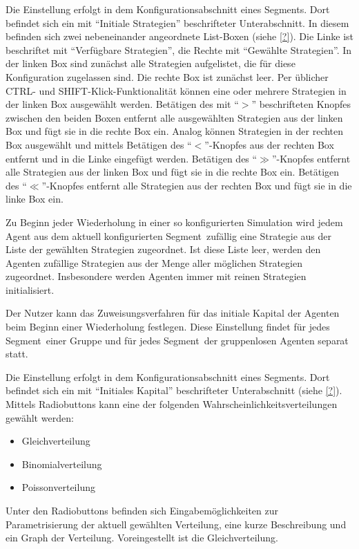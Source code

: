 \documentclass[parskip=full,11pt]{scrartcl}
\def\segment{Segment}
\begin{document}
Die Einstellung erfolgt in dem Konfigurationsabschnitt eines \segment s. Dort befindet sich ein mit \enquote{Initiale Strategien} beschrifteter Unterabschnitt. In diesem befinden sich zwei nebeneinander angeordnete List-Boxen (siehe \cref{?}). Die Linke ist beschriftet mit \enquote{Verfügbare Strategien}, die Rechte mit \enquote{Gewählte Strategien}. In der linken Box sind zunächst alle Strategien aufgelistet, die für diese Konfiguration zugelassen sind. Die rechte Box ist zunächst leer. Per üblicher \textsf{CTRL}- und \textsf{SHIFT}-Klick-Funktionalität können eine oder mehrere Strategien in der linken Box ausgewählt werden. Betätigen des mit \enquote{\(>\)} beschrifteten Knopfes zwischen den beiden Boxen entfernt alle ausgewählten Strategien aus der linken Box und fügt sie in die rechte Box ein. Analog können Strategien in der rechten Box ausgewählt und mittels Betätigen des \enquote{\(<\)}-Knopfes aus der rechten Box entfernt und in die Linke eingefügt werden. Betätigen des \enquote{\(\gg\)}-Knopfes entfernt alle Strategien aus der linken Box und fügt sie in die rechte Box ein. Betätigen des \enquote{\(\ll\)}-Knopfes entfernt alle Strategien aus der rechten Box und fügt sie in die linke Box ein.

Zu Beginn jeder Wiederholung in einer so konfigurierten Simulation wird jedem Agent aus dem aktuell konfigurierten \segment\ zufällig eine Strategie aus der Liste der gewählten Strategien zugeordnet. Ist diese Liste leer, werden den Agenten zufällige Strategien aus der Menge aller möglichen Strategien zugeordnet. Insbesondere werden Agenten immer mit reinen Strategien initialisiert.

Der Nutzer kann das Zuweisungsverfahren für das initiale Kapital der Agenten beim Beginn einer Wiederholung festlegen. Diese Einstellung findet für jedes \segment\ einer Gruppe und für jedes \segment\ der gruppenlosen Agenten separat statt.

Die Einstellung erfolgt in dem Konfigurationsabschnitt eines \segment s. Dort befindet sich ein mit \enquote{Initiales Kapital} beschrifteter Unterabschnitt (siehe \cref{?}). Mittels Radiobuttons kann eine der folgenden Wahrscheinlichkeitsverteilungen gewählt werden:
\begin{itemize}\itemsep -10pt
\item Gleichverteilung
\item Binomialverteilung
\item Poissonverteilung
\end{itemize}
Unter den Radiobuttons befinden sich Eingabemöglichkeiten zur Parametrisierung der aktuell gewählten Verteilung, eine kurze Beschreibung und ein Graph der Verteilung. Voreingestellt ist die Gleichverteilung.
\end{document}
